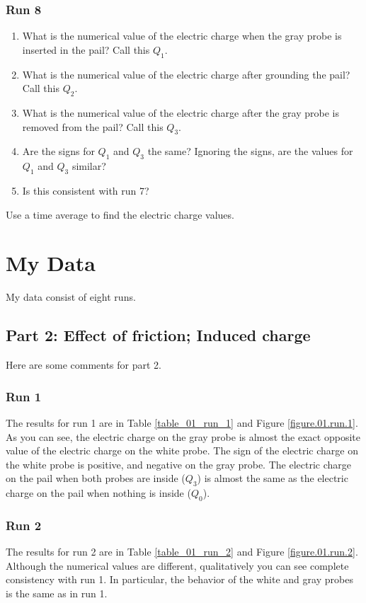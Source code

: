 \subsubsection{Run 8}
%
\begin{enumerate}
	\item What is the numerical value of the electric charge when the gray probe is inserted in the pail? Call this $Q_{1}$.
	\item What is the numerical value of the electric charge after grounding the pail? Call this $Q_{2}$.
	\item What is the numerical value of the electric charge after the gray probe is removed from the pail? Call this $Q_{3}$.
	\item Are the signs for $Q_{1}$ and $Q_{3}$ the same? Ignoring the signs, are the values for $Q_{1}$ and $Q_{3}$ similar?
	\item Is this consistent with run 7?
\end{enumerate}
Use a time average to find the electric charge values.
%
\section{My Data}
%
My data consist of eight runs.
%
\subsection{Part 2: Effect of friction; Induced charge}
%
Here are some comments for part 2.
%
\subsubsection{Run 1}
%
The results for run 1 are in Table \ref{table_01_run_1} and Figure \ref{figure.01.run.1}. As you can see, the electric charge on the gray probe is almost the exact opposite value of the electric charge on the white probe. The sign of the electric charge on the white probe is positive, and negative on the gray probe. The electric charge on the pail when both probes are inside ($Q_{3}$) is almost the same as the electric charge on the pail when nothing is inside ($Q_{0}$).
%
\subsubsection{Run 2}
%
The results for run 2 are in Table \ref{table_01_run_2} and Figure \ref{figure.01.run.2}. Although the numerical values are different, qualitatively you can see complete consistency with run 1. In particular, the behavior of the white and gray probes is the same as in run 1.
%
